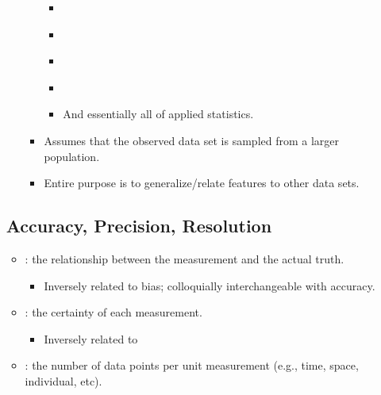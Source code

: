 \begin{itemize}
\begin{itemize}
\begin{itemize}
\begin{itemize}
            \item \hyperref[Chapter: Probability Theory]{}
            \item \hyperref[Chapter: Hypothesis Testing]{}
            \item \hyperref[Section: T-Tests]{}
            \item \hyperref[Chapter: Confidence Intervals]{}
            \item And essentially all of applied statistics.
          \end{itemize}
        \item Assumes that the observed data set is sampled from a larger population. 
        \item Entire purpose is to generalize/relate features to other data sets.
      \end{itemize}
  \end{itemize}

  \subsection{Accuracy, Precision, Resolution}
  \begin{itemize}
    \item {}: the relationship between the measurement and the actual truth.
      \begin{itemize}
        \item Inversely related to bias; colloquially interchangeable with accuracy. 
      \end{itemize}
    \item {}: the certainty of each measurement.
      \begin{itemize}
        \item Inversely related to \hyperref[Subsection: Measures of Dispersion]{}
      \end{itemize}
    \item {}: the number of data points per unit measurement (e.g., time, space, individual, etc).
  \end{itemize}
  

\end{itemize}
